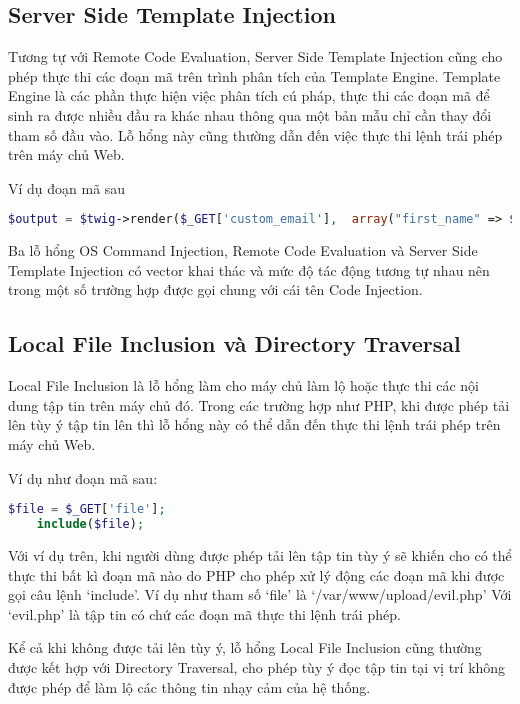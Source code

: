 \documentclass[./../main.tex]{subfiles}
\begin{document}
\subsection{Server Side Template Injection}
Tương tự với Remote Code Evaluation, Server Side Template Injection cũng cho phép thực thi các đoạn mã trên trình phân tích của Template Engine. Template Engine là các phần thực hiện việc phân tích cú pháp, thực thi các đoạn mã để sinh ra được nhiều đầu ra khác nhau thông qua một bản mẫu chỉ cần thay đổi tham số đầu vào. Lỗ hổng này cũng thường dẫn đến việc thực
thi lệnh trái phép trên máy chủ Web.

Ví dụ đoạn mã sau

\begin{lstlisting}[language=php, caption=Lỗ hổng Server Side Template Injection]
    $output = $twig->render($_GET['custom_email'],  array("first_name" => $user.first_name) );
\end{lstlisting}

Ba lỗ hổng OS Command Injection, Remote Code Evaluation và Server Side Template Injection có vector khai thác và mức độ tác động tương tự nhau nên trong một số trường hợp được gọi chung với cái tên Code Injection.

\subsection{Local File Inclusion và Directory Traversal}
Local File Inclusion là lỗ hổng làm cho máy chủ làm lộ hoặc thực thi các
nội dung tập tin trên máy chủ đó. Trong các trường hợp như PHP, khi được
phép tải lên tùy ý tập tin lên thì lỗ hổng này có thể dẫn đến thực thi lệnh
trái phép trên máy chủ Web.

Ví dụ như đoạn mã sau:

\begin{lstlisting}[language=php, caption=Lỗ hổng Local File Inclusion]
    $file = $_GET['file'];
    include($file);
\end{lstlisting}

Với ví dụ trên, khi người dùng được phép tải lên tập tin tùy ý sẽ khiến cho có thể thực thi bất kì đoạn mã nào do PHP cho phép xử lý động các đoạn mã
khi được gọi câu lệnh `include'. Ví dụ như tham số `file' là `/var/www/upload/evil.php' Với `evil.php' là tập tin có chứ các đoạn mã thực thi lệnh
trái phép.

Kể cả khi không được tải lên tùy ý, lỗ hổng Local File Inclusion cũng
thường được kết hợp với Directory Traversal, cho phép tùy ý đọc tập tin
tại vị trí không được phép để làm lộ các thông tin nhạy cảm của hệ thống.
\end{document}
